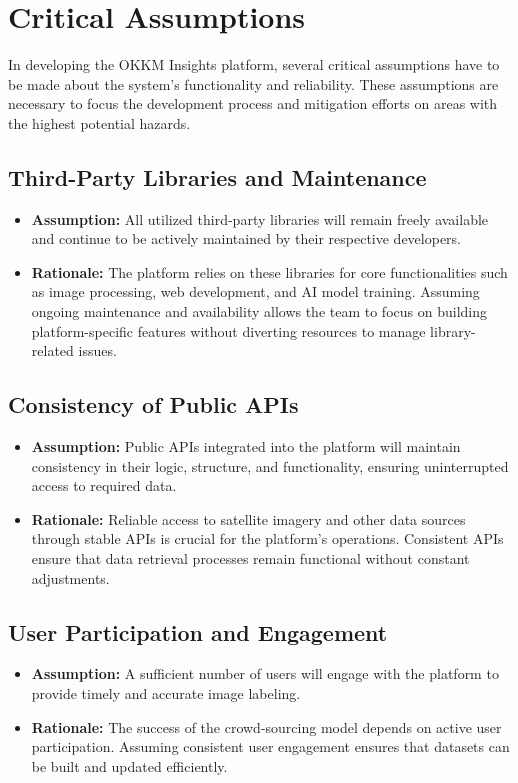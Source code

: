 \documentclass{article}
\begin{document}
\section{Critical Assumptions}

In developing the OKKM Insights platform, several critical assumptions have to be made about the system's functionality and reliability. These assumptions are necessary to focus the development process and mitigation efforts on areas with the highest potential hazards.

\subsection*{Third-Party Libraries and Maintenance}
\begin{itemize}
  \item \textbf{Assumption:} All utilized third-party libraries will remain freely available and continue to be actively maintained by their respective developers.
  \item \textbf{Rationale:} The platform relies on these libraries for core functionalities such as image processing, web development, and AI model training. Assuming ongoing maintenance and availability allows the team to focus on building platform-specific features without diverting resources to manage library-related issues.
\end{itemize}

\subsection*{Consistency of Public APIs}
\begin{itemize}
  \item \textbf{Assumption:} Public APIs integrated into the platform will maintain consistency in their logic, structure, and functionality, ensuring uninterrupted access to required data.
  \item \textbf{Rationale:} Reliable access to satellite imagery and other data sources through stable APIs is crucial for the platform's operations. Consistent APIs ensure that data retrieval processes remain functional without constant adjustments.
\end{itemize}

\subsection*{User Participation and Engagement}
\begin{itemize}
  \item \textbf{Assumption:} A sufficient number of users will engage with the platform to provide timely and accurate image labeling.
  \item \textbf{Rationale:} The success of the crowd-sourcing model depends on active user participation. Assuming consistent user engagement ensures that datasets can be built and updated efficiently.
\end{itemize}
\end{document}
